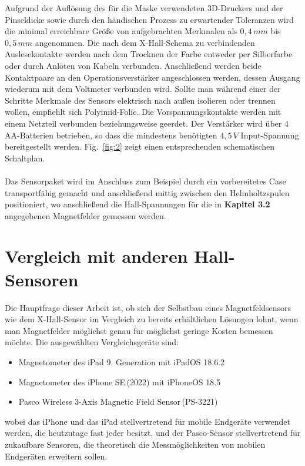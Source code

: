 \documentclass[12pt, a4paper]{article}
\begin{document}
Aufgrund der Auflösung des für die Maske verwendeten 3D-Druckers und der Pinseldicke sowie durch den händischen Prozess zu erwartender Toleranzen wird die minimal erreichbare Größe von aufgebrachten Merkmalen als $0,4\,mm$ bis $0,5\,mm$ angenommen.\newline
Die nach dem X-Hall-Schema zu verbindenden Auslesekontakte werden nach dem Trocknen der Farbe entweder per Silberfarbe oder durch Anlöten von Kabeln verbunden. Anschließend werden beide Kontaktpaare an den Operationsverstärker angeschlossen werden, dessen Ausgang wiederum mit dem Voltmeter verbunden wird.\newline
Sollte man während einer der Schritte Merkmale des Sensors elektrisch nach außen isolieren oder trennen wollen, empfiehlt sich Polyimid-Folie.\newline
Die Vorspannungskontakte werden mit einem Netzteil verbunden beziehungsweise geerdet. Der Verstärker wird über 4 AA-Batterien betrieben, so dass die mindestens benötigten $4,5\,V$ Input-Spannung bereitgestellt werden. Fig.~\ref{fig:2} zeigt einen entsprechenden schematischen Schaltplan.\paragraph{}
Das Sensorpaket wird im Anschluss zum Beispiel durch ein vorbereitetes Case transportfähig gemacht und anschließend mittig zwischen den Helmholtzspulen positioniert, wo anschließend die Hall-Spannungen für die in \textbf{Kapitel 3.2} angegebenen Magnetfelder gemessen werden.


\section{Vergleich mit anderen Hall-Sensoren}


Die Hauptfrage dieser Arbeit ist, ob sich der Selbstbau eines Magnetfeldsensors wie dem X-Hall-Sensor im Vergleich zu bereits erhältlichen Lösungen lohnt, wenn man Magnetfelder möglichst genau für möglichst geringe Kosten bemessen möchte.\newline
Die ausgewählten Vergleichsgeräte sind:
\begin{itemize}
	\item Magnetometer des iPad 9. Generation mit iPadOS 18.6.2
	\item Magnetometer des iPhone SE\,(2022) mit iPhoneOS 18.5
	\item Pasco Wireless 3-Axis Magnetic Field Sensor\,(PS-3221) 
\end{itemize} 
wobei das iPhone und das iPad stellvertretend für mobile Endgeräte verwendet werden, die heutzutage fast jeder besitzt, und der Pasco-Sensor stellvertretend für zukaufbare Sensoren, die theoretisch die Messmöglichkeiten von mobilen Endgeräten erweitern sollen.
\end{document}
